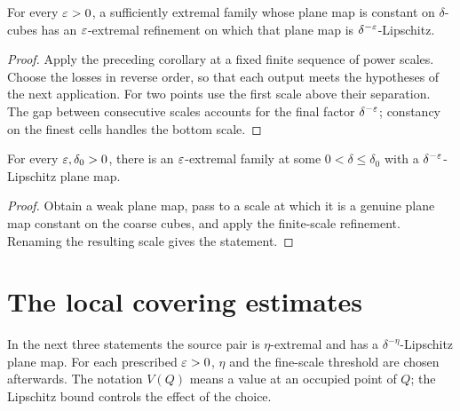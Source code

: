 \begin{lemma}
\label{lem:finite-lipschitz}
For every $\varepsilon>0$, a sufficiently extremal family whose plane map
is constant on $\delta$-cubes has an $\varepsilon$-extremal refinement on
which that plane map is $\delta^{-\varepsilon}$-Lipschitz.
\end{lemma}
\begin{proof}
Apply the preceding corollary at a fixed finite sequence of power
scales. Choose the losses in reverse order, so that each output meets
the hypotheses of the next application. For two points use the first
scale above their separation. The gap between consecutive scales
accounts for the final factor $\delta^{-\varepsilon}$; constancy on the
finest cells handles the bottom scale.
\end{proof}

\begin{lemma}
\label{lem:lipschitz-plane-map}
For every $\varepsilon,\delta_0>0$, there is an $\varepsilon$-extremal family at
some $0<\delta\leq\delta_0$ with a $\delta^{-\varepsilon}$-Lipschitz plane
map.
\end{lemma}
\begin{proof}
Obtain a weak plane map, pass to a scale at which it is a genuine
plane map constant on the coarse cubes, and apply the finite-scale
refinement. Renaming the resulting scale gives the statement.
\end{proof}

\section{The local covering estimates}

In the next three statements the source pair is $\eta$-extremal and
has a $\delta^{-\eta}$-Lipschitz plane map. For each prescribed
$\varepsilon>0$, $\eta$ and the fine-scale threshold are chosen afterwards.
The notation $V(Q)$ means a value at an occupied point of $Q$; the
Lipschitz bound controls the effect of the choice.

